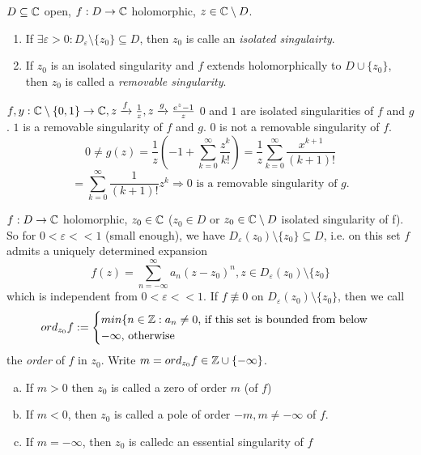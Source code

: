 \begin{definition}
  $D\subseteq \mathbb{C}$ open, $f: D\to \mathbb{C}$ holomorphic, $z\in \mathbb{C} \setminus D$.
    \begin{enumerate}
      \item If $\exists \varepsilon >0 : D_{\varepsilon} \setminus \{z_0\} \subseteq D$, then $z_0$ is calle  an \emph{isolated singulairty}.
      \item If $z_0$ is an isolated singularity and $f$ extends holomorphically to $D\cup \{ z_0 \}$, then $z_0$ is called a \emph{removable singularity}.
    \end{enumerate}
\end{definition}

\begin{example}
  $f,y : \mathbb{C}\setminus\{0,1\} \to \mathbb{C}, z\xrightarrow{ f} \frac{1}{z}, z \xrightarrow{g} \frac{e^z-1}{z}$
  \newline $0$ and $1$ are isolated singularities of $f$ and $g$. $1$ is a removable singularity of $f$ and $g$. $0$ is not a removable singularity of $f$.
    $$0 \neq g(z)=\frac{1}{z}\left(-1 + \sum_{k=0}^{\infty}\frac{z^k}{k!} \right)= \frac{1}{z}\sum_{k=0}^{\infty} \frac{x^{k+1}}{(k+1)!}$$
    $$= \sum_{k=0}^{\infty}\frac{1}{(k+1)!}z^k \Rightarrow 0 \text{ is a removable singularity of }g.$$
\end{example}

\begin{definition}
  $f: D \to \mathbb{C}$ holomorphic, $z_0 \in \mathbb{C}$ ($z_0 \in D$ or $z_0 \in \mathbb{C}\setminus D$ isolated singularity of f). So for $0 < \varepsilon < < 1$ (small enough), we have $D_{\varepsilon}(z_0)\setminus \{z_0\}\subseteq D$, i.e. on this set $f$ admits a uniquely determined expansion
    $$f(z)= \sum_{n=-\infty}^{\infty}a_n(z-z_0)^n, z \in D_{\varepsilon}(z_0)\setminus\{z_0\}$$
    which is independent from $0 < \varepsilon <<1$. If $f \not\equiv 0$ on $D_{\varepsilon }(z_0)\setminus\{z_0\}$, then we call
    $$ord_{z_0}f: =
      \begin{cases}
        min\{n\in \mathbb{Z} : a_n \neq 0 \text{, if this set is bounded from below} \\
        - \infty \text{, otherwise}
      \end{cases}$$
    the \emph{order} of $f$ in $z_0$. Write $m=ord_{z_0}f \in \mathbb{Z} \cup \{ -\infty\}$.
      \begin{enumerate}[(a)]
        \item If $m>0$ then $z_0$ is called a zero of order $m$ (of $f$)
        \item If $m<0$, then $z_0$ is called a pole of order $-m, m\neq -\infty$ of $f$.
        \item If $m= - \infty$, then $z_0$ is calledc an essential singularity of $f$
      \end{enumerate}
\end{definition}

